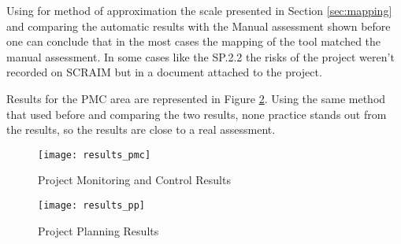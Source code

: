 Using for method of approximation the scale presented in Section \ref{sec:mapping} and comparing the automatic results with the Manual assessment shown before one can conclude that in the most cases the mapping of the tool matched the manual assessment. In some cases like  the SP.2.2 the risks of the project weren't recorded on SCRAIM but in a document attached to the project.


Results for the PMC area are represented in Figure \ref{fig:results_pmc}. Using the same method that used before and comparing the two results, none practice stands out from the results, so the results are close to a real assessment.


\begin{figure}[!htb]
	\begin{center}
		\leavevmode
		\texttt{[image: results\_pmc]}
		\caption{Project Monitoring and Control Results}
		\label{fig:results_pp}
	\end{center}
\end{figure}

\begin{figure}[!htb]
	\begin{center}
		\leavevmode
		\texttt{[image: results\_pp]}
		\caption{Project Planning Results}
		\label{fig:results_pmc}
	\end{center}
\end{figure}